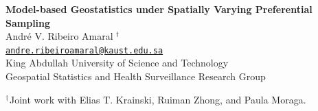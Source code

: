 \documentclass[10pt, aspectratio = 169, handout]{beamer} %
\author{André Victor Ribeiro Amaral}
\let\oldtextbf\textbf
\renewcommand\textbf[1]{\textcolor{titles}{\oldtextbf{#1}}}
\begin{document}
	\AtBeginSection{}
	{

        \begin{frame}[t]
            
            \centering
            \vspace{65pt}
            \textbf{{\large {}Model-based Geostatistics under Spatially Varying Preferential Sampling}} \\
            \vspace{15pt}
            {\normalsize André V.\hspace{1pt} Ribeiro Amaral${}^{\hspace{-1pt}~\dagger}$}\\
            {\scriptsize\texttt{\href{mailto:andre.ribeiroamaral@kaust.edu.sa}{andre.ribeiroamaral@kaust.edu.sa}}} \\
            \vspace{15pt}
            {\small King Abdullah University of Science and Technology}\\
            {\small Geospatial Statistics and Health Surveillance Research Group} \\ \vspace{15pt}

            \begin{flushleft} 
            {\small ${}^{\dagger\hspace{1pt}}$Joint work with Elias T. Krainski, Ruiman Zhong, and Paula Moraga.}
            \end{flushleft}
        \end{frame}
  	}
\end{document}
